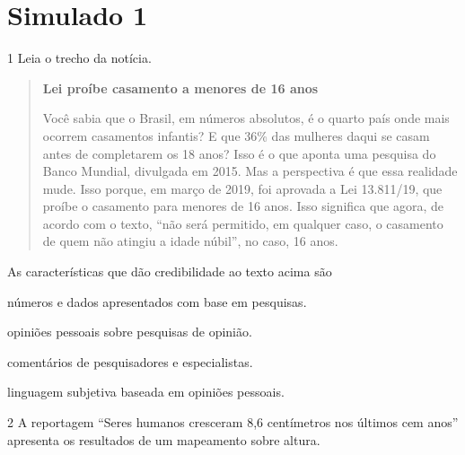 \chapter{Simulado 1}

\num{1} Leia o trecho da notícia.

\begin{quote}
\textbf{Lei proíbe casamento a menores de 16 anos}

Você sabia que o Brasil, em números absolutos, é o quarto país onde mais
ocorrem casamentos infantis? E que 36\% das mulheres daqui se casam
antes de completarem os 18 anos? Isso é o que aponta uma pesquisa do
Banco Mundial, divulgada em 2015. Mas a perspectiva é que essa realidade
mude. Isso porque, em março de 2019, foi aprovada a Lei 13.811/19, que
proíbe o casamento para menores de 16 anos. Isso significa que agora, de
acordo com o texto, ``não será permitido, em qualquer caso, o casamento
de quem não atingiu a idade núbil'', no caso, 16 anos.

\end{quote}

As características que dão credibilidade ao texto acima são

\begin{escolha}
\item números e dados apresentados com base em pesquisas.

\item opiniões pessoais sobre pesquisas de opinião.

\item comentários de pesquisadores e especialistas.

\item linguagem subjetiva baseada em opiniões pessoais.
\end{escolha}



\num{2} A reportagem ``Seres humanos cresceram 8,6 centímetros nos últimos cem
anos'' apresenta os resultados de um mapeamento sobre altura.

